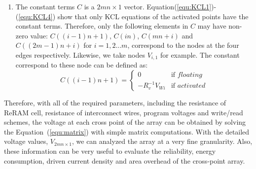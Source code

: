 \begin{enumerate}
  \item The constant terms $C$ is a $2mn{\times}1$ vector. Equation(\ref{equ:KCL1})-(\ref{equ:KCL4}) show that only KCL equations of the activated points have the constant terms. Therefore, only the following elements in $C$ may have non-zero value: $C((i-1)n+1)$, $C(in)$, $C(mn+i)$ and $C((2m-1)n+i)$ for $i=1,2...m$, correspond to the nodes at the four edges respectively. Likewise, we take nodes $V_{i,1}$ for example. The constant correspond to these node can be defined as:
    \begin{equation}
    C((i-1)n+1) = \left\{
    \begin{array}{ll}
    0   & \text{if } floating\\
    -R_v^{-1}V_{Wi}& \text{if } activated
    \end{array} \right.
    \end{equation}
\end{enumerate}

Therefore, with all of the required parameters, including the resistance of ReRAM cell, resistance of interconnect wires, program voltages and write/read schemes, the voltage at each cross point of the array can be obtained by solving the Equation~(\ref{equ:matrix}) with simple matrix computations. With the detailed voltage values, $V_{2mn{\times}1}$, we can analyzed the array at a very fine granularity. Also, these information can be very useful to evaluate the reliability, energy consumption, driven current density and area overhead of the cross-point array. 